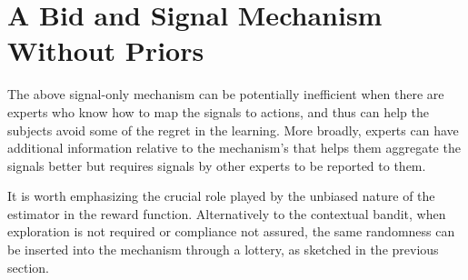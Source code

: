 \section{A Bid and Signal Mechanism Without Priors}



The above signal-only mechanism can be potentially inefficient when there are experts who know how to map the signals to actions, and thus can help the subjects avoid some of the regret in the learning.
More broadly, experts can have additional information relative to the mechanism's that helps them aggregate the signals better but requires signals by other experts to be reported to them. 

It is worth emphasizing the crucial role played by the unbiased nature of the estimator in the reward function.
Alternatively to the contextual bandit, when exploration is not required or compliance not assured, the same randomness can be inserted into the mechanism through a lottery, as sketched in the previous section.


